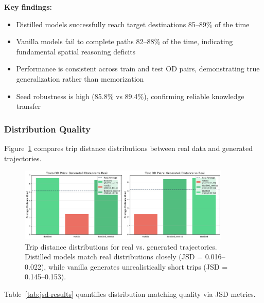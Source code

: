 \textbf{Key findings:}
\begin{itemize}[noitemsep,topsep=0pt]
    \item Distilled models successfully reach target destinations 85--89\% of the time
    \item Vanilla models fail to complete paths 82--88\% of the time, indicating fundamental spatial reasoning deficits
    \item Performance is consistent across train and test OD pairs, demonstrating true generalization rather than memorization
    \item Seed robustness is high (85.8\% vs 89.4\%), confirming reliable knowledge transfer
\end{itemize}

\subsubsection{Distribution Quality}

Figure~\ref{fig:distance-distributions} compares trip distance distributions between real data and generated trajectories.

\begin{figure}[h]
    \centering
    \includegraphics[width=0.9\textwidth]{assets/plots/hoser/distance_distributions.pdf}
    \caption{Trip distance distributions for real vs. generated trajectories. Distilled models match real distributions closely (JSD = 0.016--0.022), while vanilla generates unrealistically short trips (JSD = 0.145--0.153).}
    \label{fig:distance-distributions}
\end{figure}

Table~\ref{tab:jsd-results} quantifies distribution matching quality via JSD metrics.


